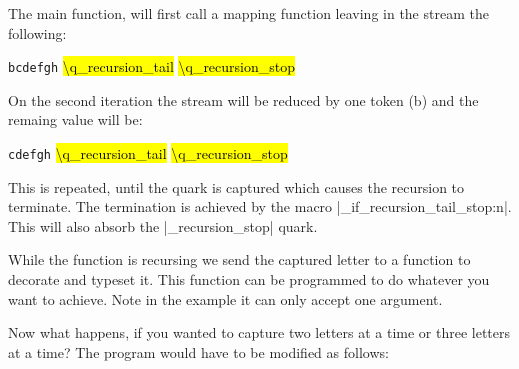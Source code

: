 
The main function, will first call a mapping function leaving in the stream the following:
\medskip

\texttt{bcdefgh} {\hl{\textbackslash q\_recursion\_tail} \hl{\textbackslash q\_recursion\_stop}}
\medskip

On the second iteration the stream will be reduced by one token (b) and the remaing value will be:
\medskip

\texttt{cdefgh} {\hl{\textbackslash q\_recursion\_tail} \hl{\textbackslash q\_recursion\_stop}}
\medskip

This is repeated, until the quark is captured which causes the recursion to terminate. The termination is achieved by
the macro |\quark_if_recursion_tail_stop:n|. This will also absorb the |\_recursion_stop| quark. 

While the function is recursing we send the captured letter to a function to decorate and typeset it. This function can be programmed to do whatever you want to achieve. Note in the example it can only accept one argument.

Now what happens, if you wanted to capture two letters at a time or three letters at a time? The program would have to be modified as follows:



